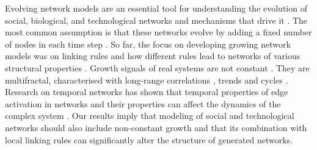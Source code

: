 Evolving network models are an essential tool for understanding the evolution of social, biological, and technological networks and mechanisms that drive it \cite{boccaletti2006}. The most common assumption is that these networks evolve by adding a fixed number of nodes in each time step \cite{boccaletti2006}. So far, the focus on developing growing network models was on linking rules and how different rules lead to networks of various structural properties \cite{boccaletti2006}. Growth signals of real systems are not constant \cite{mitrovic2015,mitrovic2012}. They are multifractal, characterised with long-range correlations \cite{mitrovic2015}, trends and cycles \cite{suvakov2013}. Research on temporal networks has shown that temporal properties of edge activation in networks and their properties can affect the dynamics of the complex system \cite{holme2012}. Our results imply that modeling of social and technological networks should also include non-constant growth and that its combination with local linking rules can significantly alter the structure of generated networks.



